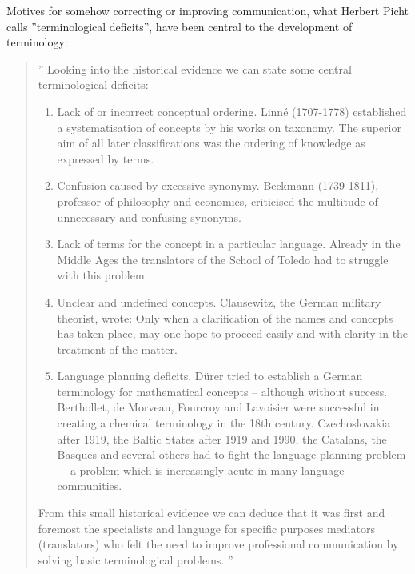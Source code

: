 \documentclass[graybox,envcountchap,sectrefs]{svmono}
\begin{document}
Motives for somehow correcting or improving communication, what Herbert Picht calls ''terminological deficits'', have been central to the development of terminology:

\begin{quote}
''
Looking into the historical evidence we can state some central terminological deficits:
\begin{enumerate}
    \item Lack of or incorrect conceptual ordering. Linn\'{e} (1707-1778) established
a systematisation of concepts by his works on taxonomy. The superior
aim of all later classifications was the ordering of knowledge as expressed
by terms.
    \item Confusion caused by excessive synonymy. Beckmann (1739-1811),
professor of philosophy and economics, criticised the multitude of unnecessary
and confusing synonyms.
    \item Lack of terms for the concept in a particular language. Already in the
Middle Ages the translators of the School of Toledo had to struggle with this problem.
 \item Unclear and undefined concepts. Clausewitz, the German military
theorist, wrote: Only when a clarification of the names and concepts has taken place, may one hope to proceed easily and with clarity in the treatment
of the matter.
 \item Language planning deficits. D\"{u}rer tried to establish a German terminology
for mathematical concepts -- although without success. Berthollet,
de Morveau, Fourcroy and Lavoisier were successful in creating a chemical terminology in the 18th century. Czechoslovakia after 1919, the Baltic States after 1919 and 1990, the Catalans, the Basques and several others had to fight the language planning problem –- a problem which is increasingly acute in many language communities.
\end{enumerate}
From this small historical evidence we can deduce that it was first and
foremost the specialists and language for specific purposes mediators
(translators) who felt the need to improve professional communication
by solving basic terminological problems.
'' \cite{picht2011science}
\end{quote}
\end{document}
